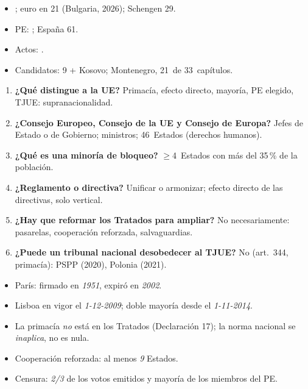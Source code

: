 \documentclass{article}
\begin{document}
\begin{columnas}
\anexorepaso
{}
\begin{itemize}
\item {}; euro en 21 (Bulgaria, 2026); Schengen 29.
\item PE: ; España 61.
\item Actos: .
\item Candidatos: 9 + Kosovo; Montenegro, 21~de 33~capítulos.
\end{itemize}
\begin{enumerate}
\item \textbf{¿Qué distingue a la UE?} Primacía, efecto directo, mayoría, PE elegido, TJUE: supranacionalidad.
\item \textbf{¿Consejo Europeo, Consejo de la UE y Consejo de Europa?} Jefes de Estado o de Gobierno; ministros; 46~Estados (derechos humanos).
\item \textbf{¿Qué es una minoría de bloqueo?} $\geq$4~Estados con más del 35\,\% de la población.
\item \textbf{¿Reglamento o directiva?} Unificar o armonizar; efecto directo de las directivas, solo vertical.
\item \textbf{¿Hay que reformar los Tratados para ampliar?} No necesariamente: pasarelas, cooperación reforzada, salvaguardias.
\item \textbf{¿Puede un tribunal nacional desobedecer al TJUE?} No (art.~344, primacía): PSPP (2020), Polonia (2021).
\end{enumerate}
\begin{trampa}
\begin{itemize}
\item París: firmado en \emph{1951}, expiró en \emph{2002}.
\item Lisboa en vigor el \emph{1-12-2009}; doble mayoría desde el \emph{1-11-2014}.
\item La primacía \emph{no} está en los Tratados (Declaración 17); la norma nacional se \emph{inaplica}, no es nula.
\item Cooperación reforzada: al menos \emph{9} Estados.
\item Censura: \emph{2/3} de los votos emitidos y mayoría de los miembros del PE.
\end{itemize}
\end{trampa}

\end{columnas}
\end{document}
